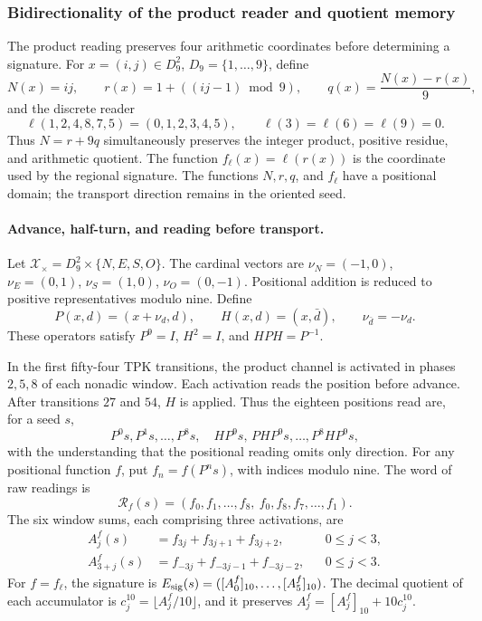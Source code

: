 \subsubsection{Bidirectionality of the product reader and quotient memory}
\label{bim09:seccion}

The product reading preserves four arithmetic coordinates before
determining a signature. For $x=(i,j)\in D_9^2$, $D_9=\{1,\ldots,9\}$,
define
\[
 N(x)=ij,\qquad r(x)=1+((ij-1)\bmod9),\qquad
 q(x)=\frac{N(x)-r(x)}9,
\]
and the discrete reader
\[
 \ell(1,2,4,8,7,5)=(0,1,2,3,4,5),\qquad
 \ell(3)=\ell(6)=\ell(9)=0.
\]
Thus $N=r+9q$ simultaneously preserves the integer product, positive residue,
and arithmetic quotient. The function $f_\ell(x)=\ell(r(x))$ is the
coordinate used by the regional signature. The functions $N,r,q$, and
$f_\ell$ have a positional domain; the transport direction remains
in the oriented seed.

\paragraph{Advance, half-turn, and reading before transport.}

Let $\mathscr X_\times=D_9^2\times\{N,E,S,O\}$. The cardinal vectors
are $\nu_N=(-1,0)$, $\nu_E=(0,1)$, $\nu_S=(1,0)$,
$\nu_O=(0,-1)$. Positional addition is reduced to positive representatives
modulo nine. Define
\[
 P(x,d)=(x+\nu_d,d),\qquad H(x,d)=(x,\bar d),
 \qquad \nu_{\bar d}=-\nu_d.
\]
These operators satisfy $P^9=I$, $H^2=I$, and $HPH=P^{-1}$.

In the first fifty-four TPK transitions, the product channel
is activated in phases $2,5,8$ of each nonadic window. Each activation
reads the position before advance. After transitions $27$ and $54$,
$H$ is applied. Thus the eighteen positions read are, for a
seed $s$,
\[
 P^0s,P^1s,\ldots,P^8s,\quad
 HP^9s,\,P H P^9s,\ldots,P^8H P^9s,
\]
with the understanding that the positional reading omits only direction.
For any positional function $f$, put $f_n=f(P^ns)$, with
indices modulo nine. The word of raw readings is
\begin{equation}
 \mathcal R_f(s)=
 (f_0,f_1,\ldots,f_8,\ f_0,f_8,f_7,\ldots,f_1).
 \label{bim09:palabra}
\end{equation}
The six window sums, each comprising three activations, are
\begin{align}
 A_j^f(s)&=f_{3j}+f_{3j+1}+f_{3j+2},&&0\leq j<3,\label{bim09:ida}\\
 A_{3+j}^f(s)&=f_{-3j}+f_{-3j-1}+f_{-3j-2},&&0\leq j<3.
 \label{bim09:vuelta}
\end{align}
For $f=f_\ell$, the signature is
$E_{\rm sig}(s)=([A_0^f]_{10},\ldots,[A_5^f]_{10})$.
The decimal quotient of each accumulator is
$c_j^{10}=\lfloor A_j^f/10\rfloor$, and it preserves
$A_j^f=[A_j^f]_{10}+10c_j^{10}$.

